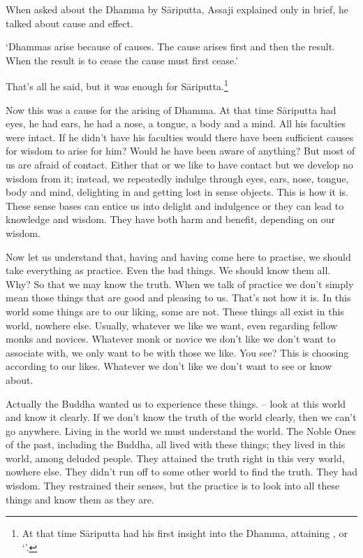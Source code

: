 When asked about the Dhamma by S\=ariputta, Assaji explained only in brief, he talked about cause and effect.

`Dhammas arise because of causes. The cause arises first and then the result. When the result is to cease the cause must first cease.'

That's all he said, but it was enough for S\=ariputta.\footnote{At that time S\=ariputta had his first insight into the Dhamma, attaining , or `'.}

Now this was a cause for the arising of Dhamma. At that time S\=ariputta had eyes, he had ears, he had a nose, a tongue, a body and a mind. All his faculties were intact. If he didn't have his faculties would there have been sufficient causes for wisdom to arise for him? Would he have been aware of anything? But most of us are afraid of contact. Either that or we like to have contact but we develop no wisdom from it; instead, we repeatedly indulge through eyes, ears, nose, tongue, body and mind, delighting in and getting lost in sense objects. This is how it is. These sense bases can entice us into delight and indulgence or they can lead to knowledge and wisdom. They have both harm and benefit, depending on our wisdom. 

Now let us understand that, having  and having come here to practise, we should take everything as practice. Even the bad things. We should know them all. Why? So that we may know the truth. When we talk of practice we don't simply mean those things that are good and pleasing to us. That's not how it is. In this world some things are to our liking, some are not. These things all exist in this world, nowhere else. Usually, whatever we like we want, even regarding fellow monks and novices. Whatever monk or novice we don't like we don't want to associate with, we only want to be with those we like. You see? This is choosing according to our likes. Whatever we don't like we don't want to see or know about. 

Actually the Buddha wanted us to experience these things.  -- look at this world and know it clearly. If we don't know the truth of the world clearly, then we can't go anywhere. Living in the world we must understand the world. The Noble Ones of the past, including the Buddha, all lived with these things; they lived in this world, among deluded people. They attained the truth right in this very world, nowhere else. They didn't run off to some other world to find the truth. They had wisdom. They restrained their senses, but the practice is to look into all these things and know them as they are. 

